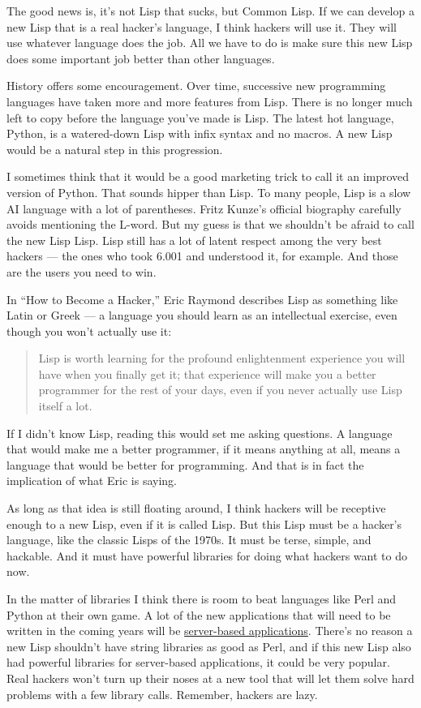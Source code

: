 The good news is, it's not Lisp that sucks, but Common Lisp. If we can
develop a new Lisp that is a real hacker's language, I think hackers
will use it. They will use whatever language does the job. All we have
to do is make sure this new Lisp does some important job better than
other languages.

History offers some encouragement. Over time, successive new programming
languages have taken more and more features from Lisp. There is no
longer much left to copy before the language you've made is Lisp. The
latest hot language, Python, is a watered-down Lisp with infix syntax
and no macros. A new Lisp would be a natural step in this progression.

I sometimes think that it would be a good marketing trick to call it an
improved version of Python. That sounds hipper than Lisp. To many
people, Lisp is a slow AI language with a lot of parentheses. Fritz
Kunze's official biography carefully avoids mentioning the L-word. But
my guess is that we shouldn't be afraid to call the new Lisp Lisp. Lisp
still has a lot of latent respect among the very best hackers --- the
ones who took 6.001 and understood it, for example. And those are the
users you need to win.

In ``How to Become a Hacker,'' Eric Raymond describes Lisp as something
like Latin or Greek --- a language you should learn as an intellectual
exercise, even though you won't actually use it:

\begin{quote}
Lisp is worth learning for the profound enlightenment experience you
will have when you finally get it; that experience will make you a
better programmer for the rest of your days, even if you never actually
use Lisp itself a lot.
\end{quote}

If I didn't know Lisp, reading this would set me asking questions. A
language that would make me a better programmer, if it means anything at
all, means a language that would be better for programming. And that is
in fact the implication of what Eric is saying.

As long as that idea is still floating around, I think hackers will be
receptive enough to a new Lisp, even if it is called Lisp. But this Lisp
must be a hacker's language, like the classic Lisps of the 1970s. It
must be terse, simple, and hackable. And it must have powerful libraries
for doing what hackers want to do now.

In the matter of libraries I think there is room to beat languages like
Perl and Python at their own game. A lot of the new applications that
will need to be written in the coming years will be
\href{road.html}{server-based applications}. There's no reason a new
Lisp shouldn't have string libraries as good as Perl, and if this new
Lisp also had powerful libraries for server-based applications, it could
be very popular. Real hackers won't turn up their noses at a new tool
that will let them solve hard problems with a few library calls.
Remember, hackers are lazy.

